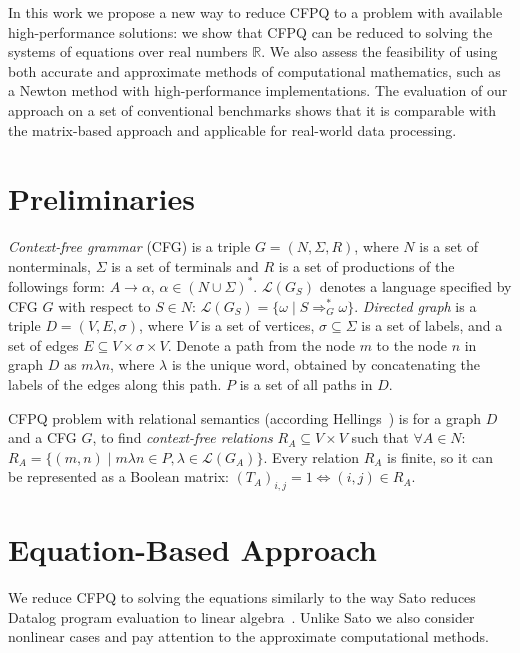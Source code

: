 \documentclass[sigconf, 10pt]{acmart}
\begin{document}
In this work we propose a new way to reduce CFPQ to a problem with available high-performance solutions: we show that CFPQ can be reduced to solving the systems of equations over real numbers $\mathbb{R}$.
We also assess the feasibility of using both accurate and approximate methods of computational mathematics, such as a Newton method with high-performance implementations.
The evaluation of our approach on a set of conventional benchmarks shows that it is comparable with the matrix-based approach and applicable for real-world data processing.

\section{Preliminaries}

\emph{Context-free grammar} (CFG) is a triple $G=(N, \Sigma, R)$, where $N$ is a set of nonterminals, $\Sigma$ is a set of terminals and $R$ is a set of productions of the followings form: $A \to \alpha$, $\alpha \in (N \cup \Sigma)^*$.
$\mathcal{L}(G_S)$ denotes a language specified by CFG $G$ with respect to $S \in N$: $\mathcal{L}(G_S) = \{\omega \mid S \Rightarrow_{G}^{*} \omega\}$.
\emph{Directed graph} is a triple $D = (V,E,\sigma)$, where $V$ is a set of vertices, $\sigma \subseteq \Sigma$ is a set of labels, and a set of edges $E\subseteq V\times \sigma \times V$.
Denote a path from the node $m$ to the node $n$ in graph $D$ as $m\lambda n$, where
$\lambda$ is the unique word, obtained by concatenating the labels of the edges along this path.
$P$ is a set of all paths in $D$.

CFPQ problem with relational semantics (according \linebreak Hellings~\cite{hellings2014conjunctive}) is for a graph $D$ and a CFG $G$, to find \emph{context-free relations} $R_A \subseteq V \times V$ such that $\forall A \in N$: $R_A = \{(m, n) \mid m\lambda n \in P, \lambda \in \mathcal{L}(G_A)\}.$
Every relation $R_A$ is finite, so it can be represented as a Boolean matrix: $(T_A)_{i,j} = 1 \Leftrightarrow (i,j) \in R_A$.

\section{Equation-Based Approach}

We reduce CFPQ to solving the equations similarly to the way Sato reduces Datalog program evaluation to linear algebra~\cite{sato2017linear}.
Unlike Sato we also consider nonlinear cases and pay attention to the approximate computational methods.
\end{document}
